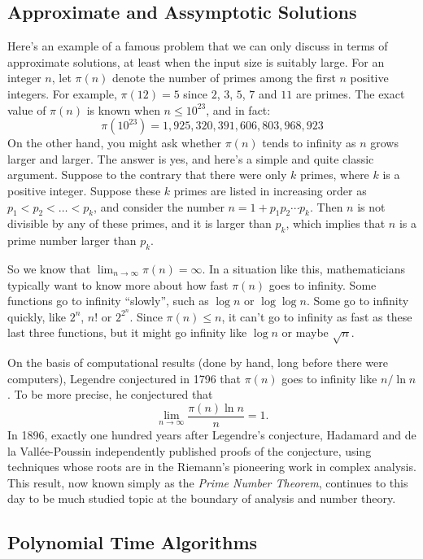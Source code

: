 \subsection{Approximate and Assymptotic Solutions}

Here's an example of a famous problem that we can only discuss in terms of
approximate solutions, at least when the input size is suitably large.
For an integer $n$, let $\pi(n)$ denote the number of primes among the 
first $n$ positive integers.  For example, 
$\pi(12)=5$ since $2$, $3$, $5$, $7$ and $11$ are primes.   
The exact value of $\pi(n)$ is known when $n\le 10^{23}$, and in fact: 
\[
\pi(10^{23}) = 1,925,320,391,606,803,968,923
\]
On the other hand, you might ask whether $\pi(n)$ tends to infinity
as $n$ grows larger and larger.  The answer is yes, 
and here's a simple and quite classic argument.  Suppose
to the contrary that there were only $k$ primes, where $k$ is a positive
integer.  Suppose these $k$ primes are listed in increasing order as
$p_1<p_2<\dots<p_k$, and consider the number $n=1+p_1p_2\cdots p_k$.
Then $n$ is not divisible by any of these primes, and it is larger than
$p_k$, which implies that $n$ is a prime number larger than $p_k$.

So we know that $\lim_{n\rightarrow\infty}\pi(n)=\infty$.
In a situation like this, mathematicians typically want to know more about 
how fast $\pi(n)$ goes to infinity.  Some functions go to infinity ``slowly'',
such as $\log n$ or $\log\log n$.  Some go to infinity quickly, like
$2^n$, $n!$ or $2^{2^n}$.  Since $\pi(n)\le n$, it can't go to infinity
as fast as these last three functions, but it might go infinity like
$\log n$ or maybe $\sqrt{n}$. 

On the basis of computational results (done by hand, long before there
were computers), Legendre conjectured in 1796 that $\pi(n)$ goes to
infinity like $n/\ln n$.  To be  more precise, he conjectured that
\[
\lim_{n\rightarrow\infty}\frac{\pi(n)\ln n}{n}=1.
\]
In 1896, exactly one hundred years after Legendre's conjecture, 
Hadamard and de la Vall\'ee-Poussin independently published proofs
of the conjecture, using techniques whose roots are in the
Riemann's pioneering work in complex analysis.  This result, now
known simply as the \textit{Prime Number Theorem}, continues to this
day to be much studied topic at the boundary of analysis and number
theory.

\subsection{Polynomial Time Algorithms}

